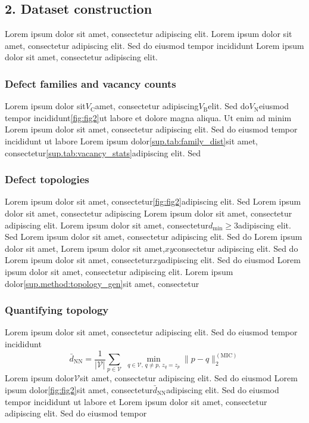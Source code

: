 \documentclass{article}
\begin{document}
\subsection*{2. Dataset construction}
\label{sec:dataset}

Lorem ipsum dolor sit amet, consectetur adipiscing elit.
Lorem ipsum dolor sit amet, consectetur adipiscing elit. Sed do eiusmod tempor incididunt
Lorem ipsum dolor sit amet, consectetur adipiscing elit.

\subsubsection*{Defect families and vacancy counts}
Lorem ipsum dolor sit$V_{\mathrm{C}}$amet, consectetur adipiscing$V_{\mathrm{B}}$elit. Sed do$V_{\mathrm{N}}$eiusmod tempor incididunt\ref{fig:fig2}ut labore et dolore magna aliqua. Ut enim ad minim
Lorem ipsum dolor sit amet, consectetur adipiscing elit. Sed do eiusmod tempor incididunt ut labore
Lorem ipsum dolor\ref{sup.tab:family_dist}sit amet, consectetur\ref{sup.tab:vacancy_stats}adipiscing elit. Sed

\subsubsection*{Defect topologies}
Lorem ipsum dolor sit amet, consectetur\ref{fig:fig2}adipiscing elit. Sed
Lorem ipsum dolor sit amet, consectetur adipiscing
Lorem ipsum dolor sit amet, consectetur adipiscing elit.
Lorem ipsum dolor sit amet, consectetur$d_{\min} \geq 3$adipiscing elit. Sed
Lorem ipsum dolor sit amet, consectetur adipiscing elit. Sed do
Lorem ipsum dolor sit amet,
Lorem ipsum dolor sit amet,$xy$consectetur adipiscing elit. Sed do
Lorem ipsum dolor sit amet, consectetur$xy$adipiscing elit. Sed do eiusmod
Lorem ipsum dolor sit amet, consectetur adipiscing elit.
Lorem ipsum dolor\ref{sup.method:topology_gen}sit amet, consectetur

\subsubsection*{Quantifying topology}
Lorem ipsum dolor sit amet, consectetur adipiscing elit. Sed do eiusmod tempor incididunt
\begin{equation}
\bar{d}_{\mathrm{NN}} = \frac{1}{|\mathcal{V}|} \sum_{p \in \mathcal{V}} \; \min_{q \in \mathcal{V},\, q \neq p,\, z_q = z_p} \|p - q\|_2^{\mathrm{(MIC)}}
\label{eq:dnn}
\end{equation}
Lorem ipsum dolor$\mathcal{V}$sit amet, consectetur adipiscing elit. Sed do eiusmod
Lorem ipsum dolor\ref{fig:fig2}sit amet, consectetur$\bar{d}_{\mathrm{NN}}$adipiscing elit. Sed do eiusmod tempor incididunt ut labore et
Lorem ipsum dolor sit amet, consectetur adipiscing elit. Sed do eiusmod tempor
\end{document}
